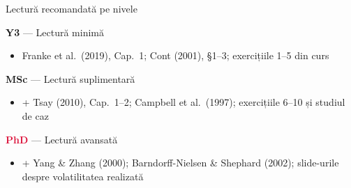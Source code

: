 \documentclass[9pt, aspectratio=169, t]{beamer}
\theoremstyle{definition}
\begin{document}
\begin{frame}{Lectură recomandată pe nivele}
\begin{block}{\textcolor{Forest}{\textbf{Y3}} --- Lectură minimă}
\begin{itemize}\setlength\itemsep{0pt}
\item Franke et al.\ (2019), Cap.\ 1; Cont (2001), \S1--3; exercițiile 1--5 din curs
\end{itemize}
\end{block}
\begin{block}{\textcolor{MainBlue}{\textbf{MSc}} --- Lectură suplimentară}
\begin{itemize}\setlength\itemsep{0pt}
\item + Tsay (2010), Cap.\ 1--2; Campbell et al.\ (1997); exercițiile 6--10 și studiul de caz
\end{itemize}
\end{block}
\begin{block}{\textcolor{Crimson}{\textbf{PhD}} --- Lectură avansată}
\begin{itemize}\setlength\itemsep{0pt}
\item + Yang \& Zhang (2000); Barndorff-Nielsen \& Shephard (2002); slide-urile despre volatilitatea realizată
\end{itemize}
\end{block}
\end{frame}
\end{document}
